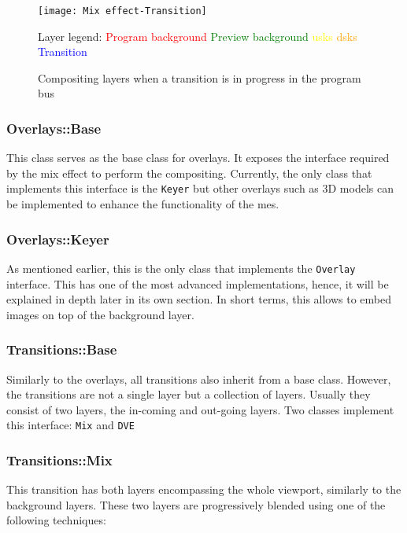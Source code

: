 \documentclass[../main.tex]{subfiles}
\begin{document}
\begin{sidewaysfigure}[htbp]
    \centering
    \texttt{[image: Mix effect-Transition]}
    
    Layer legend: \textcolor{red}{Program background} \textcolor{green}{Preview background} \textcolor{yellow}{\glspl{usk}} \textcolor{orange}{\glspl{dsk}} \textcolor{blue}{Transition} 
    \caption{Compositing layers when a transition is in progress in the program bus}
    \label{fig:04:compositing_transition}
\end{sidewaysfigure}

\subsubsection{Overlays::Base}
This class serves as the base class for overlays. It exposes the interface required by the mix effect to perform the compositing. Currently, the only class that implements this interface is the \texttt{Keyer} but other overlays such as 3D models can be implemented to enhance the functionality of the \glspl{me}.

\subsubsection{Overlays::Keyer}
As mentioned earlier, this is the only class that implements the \texttt{Overlay} interface. This has one of the most advanced implementations, hence, it will be explained in depth later in its own section. In short terms, this allows to embed images on top of the background layer.

\subsubsection{Transitions::Base}
Similarly to the overlays, all transitions also inherit from a base class. However, the transitions are not a single layer but a collection of layers. Usually they consist of two layers, the in-coming and out-going layers. Two classes implement this interface: \texttt{Mix} and \texttt{DVE}

\subsubsection{Transitions::Mix}
This transition has both layers encompassing the whole viewport, similarly to the background layers. These two layers are progressively blended using one of the following techniques:
\end{document}
